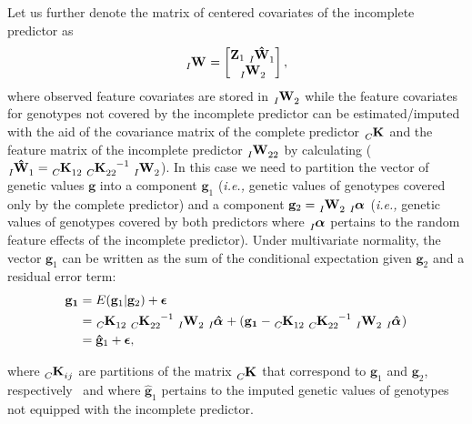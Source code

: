 \documentclass[12pt,titlepage]{article}
\begin{document}
Let us further denote the matrix of centered covariates of the incomplete
predictor as
\begin{equation} \label{eq:incomplete-covariates}
\tensor[_{I}]{\mathbf{W}}{} =
\begin{bmatrix}
  \mathbf{Z}_{1} \; \tensor[_{I}]{\mathbf{\hat{W}}}{_{1}} \\
  \tensor[_I]{\mathbf{W}}{_{2}}
 \end{bmatrix},
\end{equation}
where observed feature covariates are stored in $\tensor[_I]{\mathbf{W}}{_{2}}$
while the feature covariates for genotypes not covered by the incomplete
predictor can be estimated/imputed with the aid of the covariance matrix of the
complete predictor $\tensor[_{C}]{\mathbf{K}}{}$ and the feature matrix of the
incomplete predictor $\tensor[_{I}]{\mathbf{W}}{_{22}}$ by calculating
($\tensor[_{I}]{\mathbf{\hat{W}}}{_{1}} = \tensor[_C]{\mathbf{K}}{_{12}} \;
\tensor[_C]{\mathbf{K}}{_{22}^{-1}} \; \tensor[_I]{\mathbf{W}}{_{2}}$).
In this case we need to partition the vector of genetic values $\mathbf{g}$
into a component $\mathbf{g}_{1}$ (\textit{i.e.,} genetic values of genotypes
covered only by the complete predictor) and a component
$\mathbf{g}_{2} = \tensor[_{I}]{\mathbf{W}}{_{2}} \; 
\tensor[_{I}]{\boldsymbol{\alpha}}{}$ (\textit{i.e.,} genetic
values of genotypes covered by both predictors where $\tensor[_{I}]{\boldsymbol{\alpha}}{}$
pertains to the random feature effects of the incomplete predictor).
Under multivariate normality, the vector $\mathbf{g}_1$ can be written as the
sum of the conditional expectation given $\mathbf{g}_2$ and a residual error
term:
\begin{align} \label{eq:mrna1}
	\mathbf{g_1} &= E(\mathbf{g}_1|\mathbf{g}_2) +
	\boldsymbol{\epsilon} \\
	&= \tensor[_{C}]{\mathbf{K}}{_{12}} \;
       	\tensor[_{C}]{\mathbf{K}}{_{22}^{-1}} \;
       	\tensor[_{I}]{\mathbf{W}}{_{2}} \;
	\tensor[_{I}]{\boldsymbol{\hat{\alpha}}}{} +
       	(\mathbf{g_1} - \tensor[_{C}]{\mathbf{K}}{_{12}} \;
	\tensor[_{C}]{\mathbf{K}}{_{22}^{-1}} \;
       	\tensor[_{I}]{\mathbf{W}}{_{2}} \;
	\tensor[_{I}]{\boldsymbol{\hat{\alpha}}}{}) \\
	&= \mathbf{\hat{g}}_1 + \boldsymbol{\epsilon},
\end{align}

where $\tensor[_{C}]{\mathbf{K}}{_{ij}}$ are partitions of the matrix
$\tensor[_{C}]{\mathbf{K}}{}$ that correspond to $\mathbf{g}_{1}$ and
$\mathbf{g}_{2}$, respectively~\cite{Fernando2014} and where
$\mathbf{\hat{g}}_{1}$ pertains to the imputed genetic values of genotypes
not equipped with the incomplete predictor.
\end{document}
